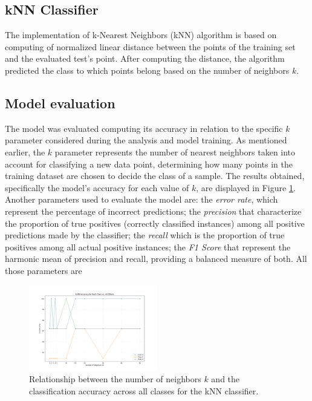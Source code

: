 \documentclass[9pt,technote]{IEEEtran}
\begin{document}
\subsection{kNN Classifier}
The implementation of k-Nearest Neighbors (kNN) algorithm is based on computing of normalized linear distance between the points of the training set and the evaluated test's point.
After computing the distance, the algorithm predicted the class to which points belong based on the number of neighbors $k$.

\subsection{Model evaluation}
The model was evaluated computing its accuracy in relation to the specific $k$ parameter considered during the analysis and model training. As mentioned earlier, the $k$ parameter represents the number of nearest neighbors taken into account for classifying a new data point, determining how many points in the training dataset are chosen to decide the class of a sample. The results obtained, specifically the model's accuracy for each value of $k$, are displayed in Figure \ref{fig::accuracy}.
Another parameters used to evaluate the model are: the \textit{error rate}, which represent the percentage of incorrect predictions; the \textit{precision} that characterize the proportion of true positives (correctly classified instances) among all positive predictions made by the classifier; the \textit{recall} which is the proportion of true positives among all actual positive instances; the \textit{F1 Score} that represent the harmonic mean of precision and recall, providing a balanced measure of both.
All those parameters are

\begin{figure}[h]
	\centering
	\includegraphics[width=0.5\textwidth]{accuracy.png}
	\caption{Relationship between the number of neighbors $k$ and the classification accuracy across all classes for the kNN classifier.}
	\label{fig::accuracy}
\end{figure}
\end{document}
